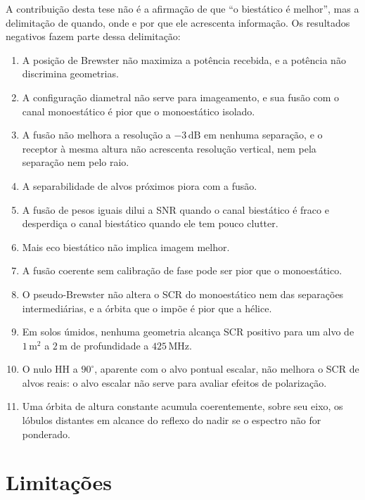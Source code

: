 \documentclass[12pt,a4paper,oneside]{book}
\theoremstyle{remark}
\newcommand{\dB}{\,\mathrm{dB}}
\theoremstyle{plain}
\theoremstyle{definition}
\begin{document}
A contribuição desta tese não é a afirmação de que ``o biestático é melhor'', mas a
delimitação de quando, onde e por que ele acrescenta informação. Os resultados
negativos fazem parte dessa delimitação:
\begin{enumerate}
  \item A posição de Brewster não maximiza a potência recebida, e a potência não
  discrimina geometrias.
  \item A configuração diametral não serve para imageamento, e sua fusão com o
  canal monoestático é pior que o monoestático isolado.
  \item A fusão não melhora a resolução a $-3\dB$ em nenhuma separação, e o receptor
  à mesma altura não acrescenta resolução vertical, nem pela separação nem pelo raio.
  \item A separabilidade de alvos próximos piora com a fusão.
  \item A fusão de pesos iguais dilui a SNR quando o canal biestático é fraco e
  desperdiça o canal biestático quando ele tem pouco clutter.
  \item Mais eco biestático não implica imagem melhor.
  \item A fusão coerente sem calibração de fase pode ser pior que o monoestático.
  \item O pseudo-Brewster não altera o SCR do monoestático nem das separações
  intermediárias, e a órbita que o impõe é pior que a hélice.
  \item Em solos úmidos, nenhuma geometria alcança SCR positivo para um alvo de
  $1\,$m$^2$ a $2\,$m de profundidade a $425\,$MHz.
  \item O nulo HH a $90^\circ$, aparente com o alvo pontual escalar, não melhora o SCR
  de alvos reais: o alvo escalar não serve para avaliar efeitos de polarização.
  \item Uma órbita de altura constante acumula coerentemente, sobre seu eixo, os
  lóbulos distantes em alcance do reflexo do nadir se o espectro não for ponderado.
\end{enumerate}

\section{Limitações}
\label{sec:concl_lim}
\end{document}
